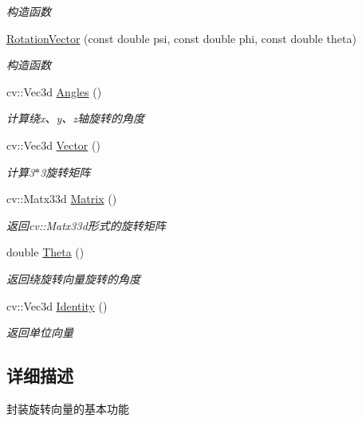 \begin{DoxyCompactItemize}
\begin{DoxyCompactList}\small\item\em 构造函数 \end{DoxyCompactList}\item 
\mbox{\hyperlink{classmy__linear__algebra_1_1_rotation_vector_a01a214165e859fbf19857e54a3272507}{Rotation\+Vector}} (const double psi, const double phi, const double theta)
\begin{DoxyCompactList}\small\item\em 构造函数 \end{DoxyCompactList}\item 
cv\+::\+Vec3d \mbox{\hyperlink{classmy__linear__algebra_1_1_rotation_vector_a0f564e3a5ea1daf12d8fc6756ae9189e}{Angles}} ()
\begin{DoxyCompactList}\small\item\em 计算绕x、y、z轴旋转的角度 \end{DoxyCompactList}\item 
cv\+::\+Vec3d \mbox{\hyperlink{classmy__linear__algebra_1_1_rotation_vector_a75bc8e1b9365cbe8123eda8f7d0109c2}{Vector}} ()
\begin{DoxyCompactList}\small\item\em 计算3$\ast$3旋转矩阵 \end{DoxyCompactList}\item 
cv\+::\+Matx33d \mbox{\hyperlink{classmy__linear__algebra_1_1_rotation_vector_ab319f77efd3cb7205a07132513f62942}{Matrix}} ()
\begin{DoxyCompactList}\small\item\em 返回cv\+::\+Matx33d形式的旋转矩阵 \end{DoxyCompactList}\item 
double \mbox{\hyperlink{classmy__linear__algebra_1_1_rotation_vector_af732226d33a250f6bbe4fe54a1c1e577}{Theta}} ()
\begin{DoxyCompactList}\small\item\em 返回绕旋转向量旋转的角度 \end{DoxyCompactList}\item 
cv\+::\+Vec3d \mbox{\hyperlink{classmy__linear__algebra_1_1_rotation_vector_acedbea80938f859a4c9e76b2c51d9300}{Identity}} ()
\begin{DoxyCompactList}\small\item\em 返回单位向量 \end{DoxyCompactList}\end{DoxyCompactItemize}


\subsection{详细描述}
封装旋转向量的基本功能 

